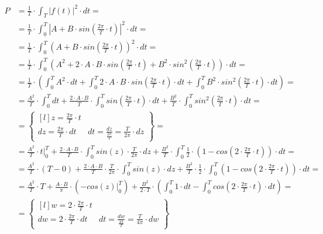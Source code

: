 \begin{task}
\begin{align*}
P&=\frac{1}{T} \cdot \int_{T}^{}\left|f(t)\right|^2 \cdot dt=\\
 &=\frac{1}{T} \cdot \int_{0}^{T}\left|A + B \cdot sin\left(\frac{2\pi}{T}\cdot t \right) \right|^2 \cdot dt=\\ 
 &=\frac{1}{T} \cdot \int_{0}^{T}\left(A + B \cdot sin\left(\frac{2\pi}{T}\cdot t \right) \right)^2 \cdot dt=\\ 
 &=\frac{1}{T} \cdot \int_{0}^{T}\left(A^2 + 2\cdot A \cdot B \cdot sin\left(\frac{2\pi}{T}\cdot t \right) + B^2 \cdot sin^2\left(\frac{2\pi}{T}\cdot t \right) \right) \cdot dt=\\
 &=\frac{1}{T} \cdot \left( \int_{0}^{T}A^2 \cdot dt + \int_{0}^{T} 2\cdot A \cdot B \cdot sin\left(\frac{2\pi}{T}\cdot t \right) \cdot dt + \int_{0}^{T} B^2 \cdot sin^2\left(\frac{2\pi}{T}\cdot t \right)  \cdot dt \right)=\\
 &=\frac{A^2}{T} \cdot \int_{0}^{T} dt + \frac{2\cdot A \cdot B}{T} \cdot \int_{0}^{T} sin\left(\frac{2\pi}{T}\cdot t \right) \cdot dt + \frac{B^2}{T} \cdot \int_{0}^{T}  sin^2\left(\frac{2\pi}{T}\cdot t \right)  \cdot dt=\\
 &=\begin{Bmatrix*}[l]
 z=\frac{2\pi}{T} \cdot t\\
 dz = \frac{2\pi}{T} \cdot dt & dt = \frac{dz}{\frac{2\pi}{T}} =\frac{T}{2\pi} \cdot dz 
 \end{Bmatrix*}=\\
 &=\frac{A^2}{T} \cdot \left. t \right|_{0}^{T} + \frac{2\cdot A \cdot B}{T} \cdot \int_{0}^{T} sin\left(z \right) \cdot \frac{T}{2\pi} \cdot dz + \frac{B^2}{T} \cdot \int_{0}^{T} \frac{1}{2} \cdot \left(1 - cos\left(2 \cdot \frac{2\pi}{T}\cdot t \right) \right)  \cdot dt=\\
 &=\frac{A^2}{T} \cdot \left( T - 0 \right) + \frac{2\cdot A \cdot B}{T} \cdot \frac{T}{2\pi} \cdot \int_{0}^{T} sin\left(z \right) \cdot dz + \frac{B^2}{T} \cdot \frac{1}{2} \cdot \int_{0}^{T} \left(1 - cos\left(2 \cdot \frac{2\pi}{T}\cdot t \right) \right)  \cdot dt=\\
 &=\frac{A^2}{T} \cdot T + \frac{A \cdot B}{\pi} \cdot \left( \left.-cos\left(z \right)\right|_{0}^{T}  \right) + \frac{B^2}{2 \cdot T} \cdot \left( \int_{0}^{T} 1 \cdot dt - \int_{0}^{T} cos\left(2 \cdot \frac{2\pi}{T}\cdot t \right)  \cdot dt \right)=\\
 &=\begin{Bmatrix*}[l]
 w=2\cdot \frac{2\pi}{T} \cdot t\\
 dw = 2\cdot \frac{2\pi}{T} \cdot dt & dt = \frac{dw}{\frac{4\pi}{T}} =\frac{T}{4\pi} \cdot dw 

\end{Bmatrix*}
\end{align*}
\end{task}
